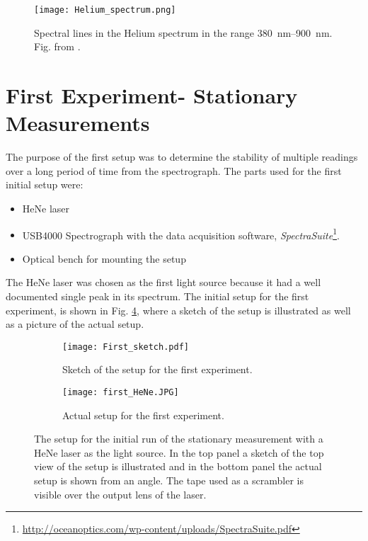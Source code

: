 \begin{figure}[h!]
\centering
\texttt{[image: Helium\_spectrum.png]}
\caption[]{Spectral lines in the Helium spectrum in the range \SIrange{380}{900}{\nano\m}. Fig. from \citep{helium}.}
\label{fig: Helium spectrum}
\end{figure}



\section{First Experiment- Stationary Measurements}
The purpose of the first setup was to determine the stability of multiple readings over a long period of time from the spectrograph. The parts used for the first initial setup were:

\begin{itemize}
\item HeNe laser
\item  USB4000 Spectrograph with the data acquisition software, \emph{SpectraSuite}\footnote{\url{http://oceanoptics.com/wp-content/uploads/SpectraSuite.pdf}}.
\item Optical bench for mounting the setup
\end{itemize}

The HeNe laser was chosen as the first light source because it had a well documented single peak in its spectrum. The initial setup for the first experiment, is shown in Fig. \ref{fig: First setups}, where a sketch of the setup is illustrated as well as a picture of the actual setup.

\begin{figure}[ht]
\centering
\begin{subfigure}{0.65\linewidth}
\texttt{[image: First\_sketch.pdf]}
\caption{Sketch of the setup for the first experiment.}
\label{fig: First_sketch}
\end{subfigure}

\begin{subfigure}{0.65\textwidth}
\texttt{[image: first\_HeNe.JPG]}
\caption{Actual setup for the first experiment.}
\label{fig: first_HeNe}
\end{subfigure}
\caption{The setup for the initial run of the stationary measurement with a HeNe laser as the light source. In the top panel a sketch of the top view of the setup is illustrated and in the bottom panel the actual setup is shown from an angle. The tape used as a scrambler is visible over the output lens of the laser.}
\label{fig: First setups}
\end{figure}

